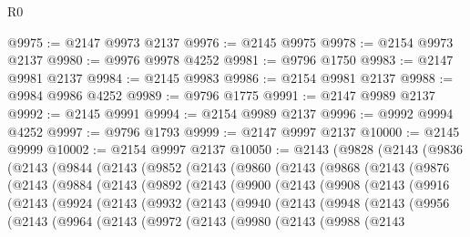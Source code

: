 \begin{lexlean}{R0}
\begin{coremodule}
@9975 := @2147 @9973 @2137
@9976 := @2145 @9975
@9978 := @2154 @9973 @2137
@9980 := @9976 @9978 @4252
@9981 := @9796 @1750
@9983 := @2147 @9981 @2137
@9984 := @2145 @9983
@9986 := @2154 @9981 @2137
@9988 := @9984 @9986 @4252
@9989 := @9796 @1775
@9991 := @2147 @9989 @2137
@9992 := @2145 @9991
@9994 := @2154 @9989 @2137
@9996 := @9992 @9994 @4252
@9997 := @9796 @1793
@9999 := @2147 @9997 @2137
@10000 := @2145 @9999
@10002 := @2154 @9997 @2137
@10050 := @2143
    (@9828
      (@2143
        (@9836
          (@2143
            (@9844
              (@2143
                (@9852
                  (@2143
                    (@9860
                      (@2143
                        (@9868
                          (@2143
                            (@9876
                              (@2143
                                (@9884
                                  (@2143
                                    (@9892
                                      (@2143
                                        (@9900
                                          (@2143
                                            (@9908
                                              (@2143
                                                (@9916
                                                  (@2143
                                                    (@9924
                                                      (@2143
                                                        (@9932
                                                          (@2143
                                                            (@9940
                                                              (@2143
                                                                (@9948
                                                                  (@2143
                                                                    (@9956
                                                                      (@2143
                                                                        (@9964
                                                                          (@2143
                                                                            (@9972
                                                                              (@2143
                                                                                (@9980
                                                                                  (@2143
                                                                                    (@9988
                                                                                      (@2143

\end{coremodule}
\end{lexlean}
